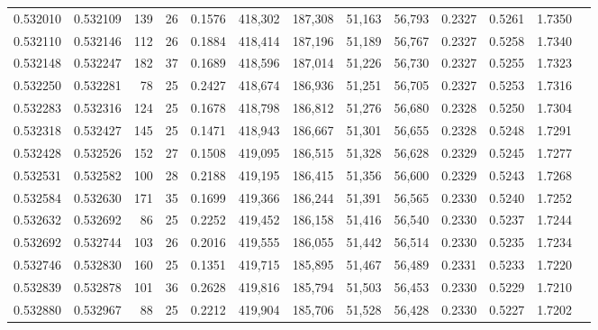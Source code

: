 \begin{tabular}{rrrrrrrrrrrrr}
0.532010 & 0.532109 & 139 &  26 &                                     0.1576 & 418,302 & 187,308 &  51,163 &  56,793 & 0.2327 & 0.5261 & 1.7350 \\
0.532110 & 0.532146 & 112 &  26 &                                     0.1884 & 418,414 & 187,196 &  51,189 &  56,767 & 0.2327 & 0.5258 & 1.7340 \\
0.532148 & 0.532247 & 182 &  37 &                                     0.1689 & 418,596 & 187,014 &  51,226 &  56,730 & 0.2327 & 0.5255 & 1.7323 \\
0.532250 & 0.532281 &  78 &  25 &                                     0.2427 & 418,674 & 186,936 &  51,251 &  56,705 & 0.2327 & 0.5253 & 1.7316 \\
0.532283 & 0.532316 & 124 &  25 &                                     0.1678 & 418,798 & 186,812 &  51,276 &  56,680 & 0.2328 & 0.5250 & 1.7304 \\
0.532318 & 0.532427 & 145 &  25 &                                     0.1471 & 418,943 & 186,667 &  51,301 &  56,655 & 0.2328 & 0.5248 & 1.7291 \\
0.532428 & 0.532526 & 152 &  27 &                                     0.1508 & 419,095 & 186,515 &  51,328 &  56,628 & 0.2329 & 0.5245 & 1.7277 \\
0.532531 & 0.532582 & 100 &  28 &                                     0.2188 & 419,195 & 186,415 &  51,356 &  56,600 & 0.2329 & 0.5243 & 1.7268 \\
0.532584 & 0.532630 & 171 &  35 &                                     0.1699 & 419,366 & 186,244 &  51,391 &  56,565 & 0.2330 & 0.5240 & 1.7252 \\
0.532632 & 0.532692 &  86 &  25 &                                     0.2252 & 419,452 & 186,158 &  51,416 &  56,540 & 0.2330 & 0.5237 & 1.7244 \\
0.532692 & 0.532744 & 103 &  26 &                                     0.2016 & 419,555 & 186,055 &  51,442 &  56,514 & 0.2330 & 0.5235 & 1.7234 \\
0.532746 & 0.532830 & 160 &  25 &                                     0.1351 & 419,715 & 185,895 &  51,467 &  56,489 & 0.2331 & 0.5233 & 1.7220 \\
0.532839 & 0.532878 & 101 &  36 &                                     0.2628 & 419,816 & 185,794 &  51,503 &  56,453 & 0.2330 & 0.5229 & 1.7210 \\
0.532880 & 0.532967 &  88 &  25 &                                     0.2212 & 419,904 & 185,706 &  51,528 &  56,428 & 0.2330 & 0.5227 & 1.7202 \\

\end{tabular}
